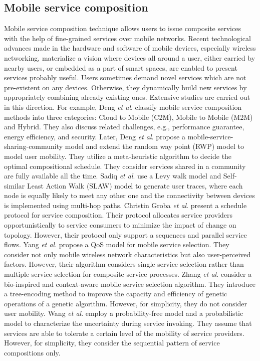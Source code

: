 \documentclass[journal]{IEEEtran}
\begin{document}
\subsection{Mobile service composition}
Mobile service composition technique allows users to issue composite services with the help of fine-grained services over mobile networks. Recent technological advances made in the hardware and software of mobile devices, especially wireless networking, materialize a vision where devices all around a user, either carried by nearby users, or embedded as a part of smart spaces, are enabled to present services probably useful. Users sometimes demand novel services which are not pre-existent on any devices. Otherwise, they dynamically build new services by appropriately combining already existing ones. Extensive studies are carried out in this direction. 
For example, Deng \emph{et al}. \cite{Deng2016} classify mobile service composition methods into three categories: Cloud to Mobile (C2M), Mobile to Mobile (M2M) and Hybrid. They also discuss related challenges, e.g., performance guarantee, energy efficiency, and security.
Later, Deng \emph{et al}. \cite{Deng2017} propose a mobile-service-sharing-community model and extend the random way point (RWP) model to model user mobility. They utilize a meta-heuristic algorithm to decide the optimal compositional schedule. They consider services shared in a community are fully available all the time.
Sadiq \emph{et al}. \cite{sadiq2015service} use a Levy walk model and Self-similar Least Action Walk (SLAW) model to generate user traces, where each node is equally likely to meet any other one and 
the connectivity between devices is implemented using multi-hop paths.
Christin Groba \emph{et al}. \cite{groba2014opportunistic} present a schedule protocol for service composition. Their protocol allocates service providers opportunistically to service consumers to minimize the impact of change on topology. However, their protocol only support a sequences and parallel service flows.
Yang \emph{et al}. \cite{Yang2010} propose a QoS model for mobile service selection. They consider not only mobile wireless network characteristics but also user-perceived factors. However, their algorithm considers single service selection rather than multiple service selection for composite service processes.
Zhang \emph{et al}. \cite{Zhang2016qos} consider a bio-inspired and context-aware mobile service selection algorithm. They introduce a tree-encoding method to improve the capacity and efficiency of genetic operations of a genetic algorithm. However, for simplicity, they do not consider user mobility.
Wang \emph{et al}. \cite{wang2011exploiting} employ a probability-free model and a probabilistic model to characterize the uncertainty during service invoking. They assume that services are able to tolerate a certain level of the mobility of service providers. However, for simplicity, they consider the sequential pattern of service compositions only.
\end{document}
